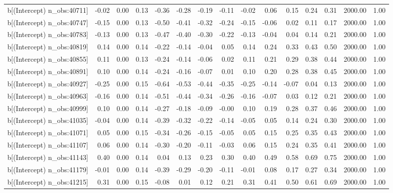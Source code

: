 \begin{table}[ht]
\begin{tabular}{rrrrrrrrrrrrrrr}
  b[(Intercept) n\_obs:40711] & -0.02 & 0.00 & 0.13 & -0.36 & -0.28 & -0.19 & -0.11 & -0.02 & 0.06 & 0.15 & 0.24 & 0.31 & 2000.00 & 1.00 \\ 
  b[(Intercept) n\_obs:40747] & -0.15 & 0.00 & 0.13 & -0.50 & -0.41 & -0.32 & -0.24 & -0.15 & -0.06 & 0.02 & 0.11 & 0.17 & 2000.00 & 1.00 \\ 
  b[(Intercept) n\_obs:40783] & -0.13 & 0.00 & 0.13 & -0.47 & -0.40 & -0.30 & -0.22 & -0.13 & -0.04 & 0.04 & 0.14 & 0.21 & 2000.00 & 1.00 \\ 
  b[(Intercept) n\_obs:40819] & 0.14 & 0.00 & 0.14 & -0.22 & -0.14 & -0.04 & 0.05 & 0.14 & 0.24 & 0.33 & 0.43 & 0.50 & 2000.00 & 1.00 \\ 
  b[(Intercept) n\_obs:40855] & 0.11 & 0.00 & 0.13 & -0.24 & -0.14 & -0.06 & 0.02 & 0.11 & 0.21 & 0.29 & 0.38 & 0.44 & 2000.00 & 1.00 \\ 
  b[(Intercept) n\_obs:40891] & 0.10 & 0.00 & 0.14 & -0.24 & -0.16 & -0.07 & 0.01 & 0.10 & 0.20 & 0.28 & 0.38 & 0.45 & 2000.00 & 1.00 \\ 
  b[(Intercept) n\_obs:40927] & -0.25 & 0.00 & 0.15 & -0.64 & -0.53 & -0.44 & -0.35 & -0.25 & -0.14 & -0.07 & 0.04 & 0.13 & 2000.00 & 1.00 \\ 
  b[(Intercept) n\_obs:40963] & -0.16 & 0.00 & 0.14 & -0.51 & -0.44 & -0.34 & -0.26 & -0.16 & -0.07 & 0.03 & 0.12 & 0.21 & 2000.00 & 1.00 \\ 
  b[(Intercept) n\_obs:40999] & 0.10 & 0.00 & 0.14 & -0.27 & -0.18 & -0.09 & -0.00 & 0.10 & 0.19 & 0.28 & 0.37 & 0.46 & 2000.00 & 1.00 \\ 
  b[(Intercept) n\_obs:41035] & -0.04 & 0.00 & 0.14 & -0.39 & -0.32 & -0.22 & -0.14 & -0.05 & 0.05 & 0.14 & 0.24 & 0.30 & 2000.00 & 1.00 \\ 
  b[(Intercept) n\_obs:41071] & 0.05 & 0.00 & 0.15 & -0.34 & -0.26 & -0.15 & -0.05 & 0.05 & 0.15 & 0.25 & 0.35 & 0.43 & 2000.00 & 1.00 \\ 
  b[(Intercept) n\_obs:41107] & 0.06 & 0.00 & 0.14 & -0.30 & -0.20 & -0.11 & -0.03 & 0.06 & 0.15 & 0.24 & 0.35 & 0.41 & 2000.00 & 1.00 \\ 
  b[(Intercept) n\_obs:41143] & 0.40 & 0.00 & 0.14 & 0.04 & 0.13 & 0.23 & 0.30 & 0.40 & 0.49 & 0.58 & 0.69 & 0.75 & 2000.00 & 1.00 \\ 
  b[(Intercept) n\_obs:41179] & -0.01 & 0.00 & 0.14 & -0.39 & -0.29 & -0.20 & -0.11 & -0.01 & 0.08 & 0.17 & 0.27 & 0.34 & 2000.00 & 1.00 \\ 
  b[(Intercept) n\_obs:41215] & 0.31 & 0.00 & 0.15 & -0.08 & 0.01 & 0.12 & 0.21 & 0.31 & 0.41 & 0.50 & 0.61 & 0.69 & 2000.00 & 1.00 \\ 

\end{tabular}
\end{table}

